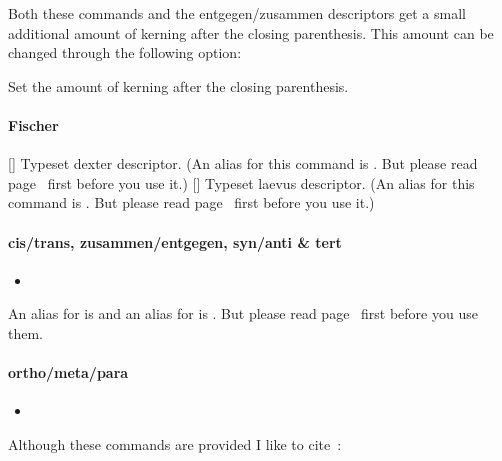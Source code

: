\documentclass[load-preamble+]{cnltx-doc}
\begin{document}
Both these commands and the entgegen/zusammen descriptors get a small
additional amount of kerning after the closing parenthesis.  This amount can
be changed through the following option:
\begin{options}
  \Default{.075em}
    Set the amount of kerning after the closing parenthesis.
\end{options}

\paragraph{Fischer}
\begin{commands}
  [\quad\iupac{\dexter}]
    Typeset dexter descriptor.  (An alias for this command is .  But
    please read page~\pageref{desc:one-letter-commands} first before you use
    it.)
  [\quad\iupac{\laevus}]
    Typeset laevus descriptor.  (An alias for this command is .  But
    please read page~\pageref{desc:one-letter-commands} first before you use
    it.)
\end{commands}

\paragraph{cis/trans, zusammen/entgegen, syn/anti \& tert}
\begin{itemize}
  \item[]
       \iupac{\cis} \quad
     \iupac{\trans} \quad
       \iupac{\fac} \quad
       \iupac{\mer} \quad
     \iupac{\zusammen} \quad
     \iupac{\entgegen} \quad
       \iupac{\syn} \quad
      \iupac{\anti} \quad
      \iupac{\tert}
\end{itemize}
An alias for  is  and an alias for  is
.  But please read page~\pageref{desc:one-letter-commands} first before
you use them.

\paragraph{ortho/meta/para}
\begin{itemize}
  \item[]
     \iupac{\ortho} \quad
      \iupac{\meta} \quad
      \iupac{\para}
\end{itemize}

Although these commands are provided I like to cite~\cite{iupac:bluebook}:
\end{document}
